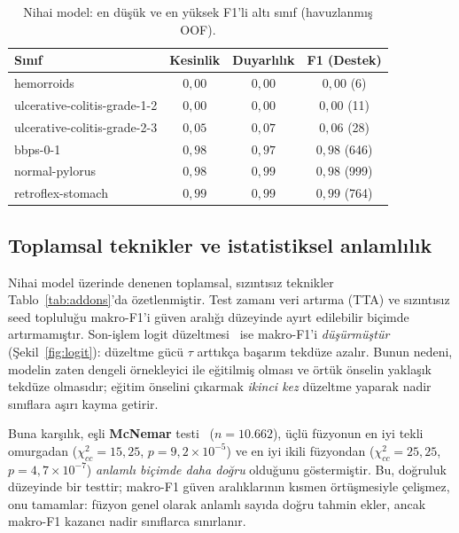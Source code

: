 \begin{table}[H]
  \centering
  \caption{Nihai model: en düşük ve en yüksek F1'li altı sınıf (havuzlanmış OOF).}
  \label{tab:perclass}
  \begin{tabular}{lccc}
    \toprule
    Sınıf & Kesinlik & Duyarlılık & F1 (Destek) \\
    \midrule
    hemorroids                     & $0{,}00$ & $0{,}00$ & $0{,}00$ (6) \\
    ulcerative-colitis-grade-1-2   & $0{,}00$ & $0{,}00$ & $0{,}00$ (11) \\
    ulcerative-colitis-grade-2-3   & $0{,}05$ & $0{,}07$ & $0{,}06$ (28) \\
    \midrule
    bbps-0-1                       & $0{,}98$ & $0{,}97$ & $0{,}98$ (646) \\
    normal-pylorus                 & $0{,}98$ & $0{,}99$ & $0{,}98$ (999) \\
    retroflex-stomach              & $0{,}99$ & $0{,}99$ & $0{,}99$ (764) \\
    \bottomrule
  \end{tabular}
\end{table}

\subsection{Toplamsal teknikler ve istatistiksel anlamlılık}
\label{sec:addons}
Nihai model üzerinde denenen toplamsal, sızıntısız teknikler
Tablo~\ref{tab:addons}'da özetlenmiştir. Test zamanı veri artırma (TTA) ve
sızıntısız seed topluluğu makro-F1'i güven aralığı düzeyinde ayırt edilebilir
biçimde artırmamıştır. Son-işlem logit düzeltmesi~\cite{menon2020logitadjust}
ise makro-F1'i \emph{düşürmüştür} (Şekil~\ref{fig:logit}): düzeltme gücü $\tau$
arttıkça başarım tekdüze azalır. Bunun nedeni, modelin zaten dengeli örnekleyici
ile eğitilmiş olması ve örtük önselin yaklaşık tekdüze olmasıdır; eğitim önselini
çıkarmak \emph{ikinci kez} düzeltme yaparak nadir sınıflara aşırı kayma getirir.

Buna karşılık, eşli \textbf{McNemar} testi~\cite{dietterich1998mcnemar}
($n=10{.}662$), üçlü füzyonun en iyi tekli omurgadan ($\chi^2_{cc}=15{,}25$,
$p=9{,}2\times10^{-5}$) ve en iyi ikili füzyondan ($\chi^2_{cc}=25{,}25$,
$p=4{,}7\times10^{-7}$) \emph{anlamlı biçimde daha doğru} olduğunu göstermiştir.
Bu, doğruluk düzeyinde bir testtir; makro-F1 güven aralıklarının kısmen
örtüşmesiyle çelişmez, onu tamamlar: füzyon genel olarak anlamlı sayıda doğru
tahmin ekler, ancak makro-F1 kazancı nadir sınıflarca sınırlanır.

